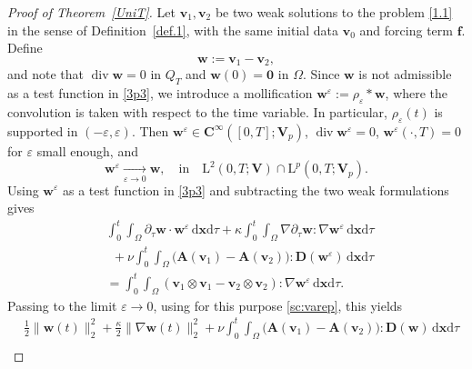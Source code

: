\documentclass[10pt,a4paper]{amsart}
\theoremstyle{definition}
\def\d{\mathrm{d}}
\def\div{\operatorname{div}}
\def\L{\mathrm{L}}
\def\vv{\boldsymbol{v}}
\def\w{\boldsymbol{w}}
\def\x{\boldsymbol{x}}
\def\bfC{\mathbf{C}}
\def\bfV{\mathbf{V}}
\def\bfD{\mathbf{D}}
\def\bfA{\mathbf{A}}
\def\bf0{\mathbf{0}}
\begin{document}
\setcounter{section}{7}
\setcounter{equation}{0}
\setcounter{claim}{2}
\setcounter{condition}{0}
\setcounter{conjecture}{0}
\setcounter{criterion}{0}
\setcounter{exercise}{0}
\setcounter{notation}{0}
\setcounter{problem}{0}
\setcounter{solution}{0}
\setcounter{theorem}{0}
\begin{proof}[Proof of Theorem~\ref{UniT}]
Let $\boldsymbol{v}_1, \boldsymbol{v}_2$ be two weak solutions  to the problem \eqref{1.1} in the sense of Definition~\ref{def.1}, with the same initial data $\boldsymbol{v}_0$ and forcing term $\boldsymbol{f}$.
Define
\begin{equation*}
\boldsymbol{w} := \boldsymbol{v}_1 - \boldsymbol{v}_2,
\end{equation*}
and note that $\div\w=0$ in $Q_T$ and $\w(0)=\bf0$ in $\Omega$.
Since $\w$ is not admissible as a test function in \eqref{3p3}, we introduce a mollification $\w^\varepsilon := \rho_\varepsilon * \w$, where the convolution is taken with respect to the time variable.
In particular, $\rho_\varepsilon(t)$ is supported in $(-\varepsilon,\varepsilon)$.
Then $\w^\varepsilon \in \bfC^\infty([0,T];\bfV_p)$, $\div\w^\varepsilon=0$, $\w^\varepsilon(\cdot,T)=0$ for $\varepsilon$ small enough, and
\begin{equation}
\label{sc:varep}
\w^\varepsilon \xrightarrow[\varepsilon\to0]{} \w,\quad \text{in}\quad \L^2(0,T;\bfV)\cap\L^p(0,T;\bfV_p).
\end{equation}
Using $\boldsymbol{w}^\varepsilon$ as a test function in \eqref{3p3} and subtracting the two weak formulations gives
\begin{align*}
& \int_0^t\!\!\int_\Omega \partial_\tau\boldsymbol{w} \cdot \boldsymbol{w}^\varepsilon \, \d \x\d\tau
+ \kappa \int_0^t\!\!\int_\Omega \nabla \partial_\tau\boldsymbol{w} : \nabla \boldsymbol{w}^\varepsilon \, \d \x\d\tau\ \\&\  \ +  \nu \int_0^t\!\!\int_\Omega \big(\bfA(\vv_1)-\bfA(\vv_2)\big):\mathbf{D}(\boldsymbol{w}^\varepsilon) \, \d \x\d\tau  \\
&= \int_0^t\!\!\int_\Omega (\boldsymbol{v}_1 \otimes \boldsymbol{v}_1 - \boldsymbol{v}_2 \otimes \boldsymbol{v}_2) : \nabla \boldsymbol{w}^\varepsilon \, \d \x\d\tau.
\end{align*}
Passing to the limit $\varepsilon \to 0$, using for this purpose \eqref{sc:varep}, this yields
\begin{equation*} %
\begin{split}
& \frac{1}{2}\|\w(t)\|_{2}^2 + \frac{\kappa}{2}\|\nabla \w(t)\|_{2}^2 + \nu \int_0^t\!\!\int_\Omega \big(\bfA(\vv_1)-\bfA(\vv_2)\big):\bfD(\w)\,\d\x\d\tau  \\

\end{split}
\end{equation*}
\end{proof}
\end{document}
